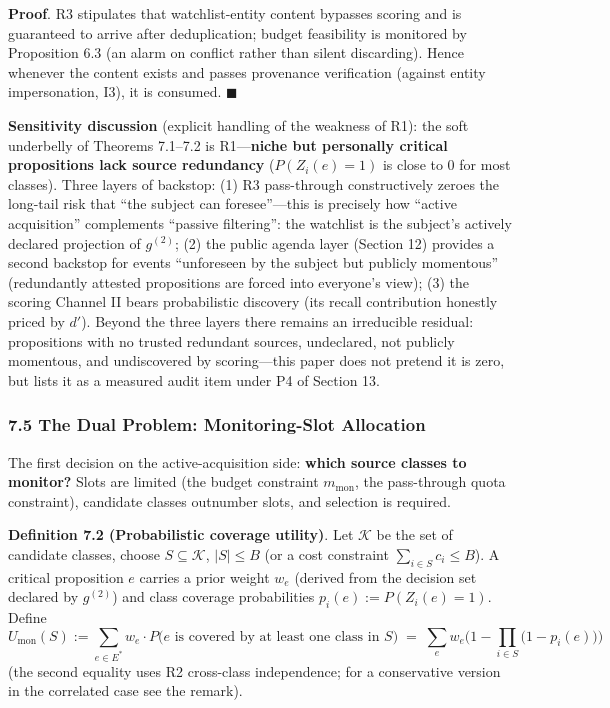 \documentclass[
  11pt]{article}
\begin{document}
\textbf{Proof}. R3 stipulates that watchlist-entity content bypasses
scoring and is guaranteed to arrive after deduplication; budget
feasibility is monitored by Proposition 6.3 (an alarm on conflict rather
than silent discarding). Hence whenever the content exists and passes
provenance verification (against entity impersonation, I3), it is
consumed. \(\blacksquare\)

\textbf{Sensitivity discussion} (explicit handling of the weakness of
R1): the soft underbelly of Theorems 7.1--7.2 is R1---\textbf{niche but
personally critical propositions lack source redundancy}
(\(P(Z_i(e)=1)\) is close to 0 for most classes). Three layers of
backstop: (1) R3 pass-through constructively zeroes the long-tail risk
that ``the subject can foresee''---this is precisely how ``active
acquisition'' complements ``passive filtering'': the watchlist is the
subject's actively declared projection of \(g^{(2)}\); (2) the public
agenda layer (Section 12) provides a second backstop for events
``unforeseen by the subject but publicly momentous'' (redundantly
attested propositions are forced into everyone's view); (3) the scoring
Channel II bears probabilistic discovery (its recall contribution
honestly priced by \(d'\)). Beyond the three layers there remains an
irreducible residual: propositions with no trusted redundant sources,
undeclared, not publicly momentous, and undiscovered by scoring---this
paper does not pretend it is zero, but lists it as a measured audit item
under P4 of Section 13.

\subsubsection{7.5 The Dual Problem: Monitoring-Slot
Allocation}\label{the-dual-problem-monitoring-slot-allocation}

The first decision on the active-acquisition side: \textbf{which source
classes to monitor?} Slots are limited (the budget constraint
\(m_{\mathrm{mon}}\), the pass-through quota constraint), candidate
classes outnumber slots, and selection is required.

\textbf{Definition 7.2 (Probabilistic coverage utility)}. Let
\(\mathcal{K}\) be the set of candidate classes, choose
\(S \subseteq \mathcal{K}\), \(|S| \le B\) (or a cost constraint
\(\sum_{i\in S} c_i \le B\)). A critical proposition \(e\) carries a
prior weight \(w_e\) (derived from the decision set declared by
\(g^{(2)}\)) and class coverage probabilities \(p_i(e) := P(Z_i(e)=1)\).
Define
\[U_{\mathrm{mon}}(S) := \sum_{e \in E^*} w_e \cdot P\big(e \text{ is covered by at least one class in } S\big) \;=\; \sum_{e} w_e \Big(1 - \prod_{i \in S}\big(1 - p_i(e)\big)\Big)\]
(the second equality uses R2 cross-class independence; for a
conservative version in the correlated case see the remark).
\end{document}
